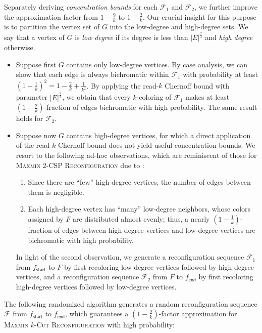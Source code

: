 \documentclass[11pt,fleqn]{article}
\newcommand{\prb}[1]{\textsc{#1}\xspace}
\newcommand{\sss}{\mathsf{start}}
\newcommand{\ttt}{\mathsf{end}}
\newcommand{\f}{f}
\newcommand{\frnd}{F}
\newcommand{\sqcol}{\scrF}
\newcommand{\MMkCutReconf}{\prb{Maxmin $k$-Cut Reconfiguration}}
\newcommand{\scrF}{\mathscr{F}}
\theoremstyle{definition}
\numberwithin{equation}{section}
\begin{document}
Separately deriving \emph{concentration bounds} for each $\sqcol_1$ and $\sqcol_2$,
we further improve the approximation factor from $1-\frac{9}{k}$ to $1-\frac{2}{k}$.
Our crucial insight for this purpose is
to partition the vertex set of $G$ into the low-degree and high-degree sets.
We say that a vertex of $G$ is
\emph{low degree} if its degree is less than $|E|^\frac{2}{3}$ and
\emph{high degree} otherwise.


\begin{itemize}
\item
Suppose first $G$ contains only low-degree vertices.
By case analysis, we can show that
each edge is always bichromatic within $\sqcol_1$
with probability at least $\left(1-\frac{1}{k}\right)^2 = 1-\frac{2}{k}+\frac{1}{k^2}$.
By applying the read-$k$ Chernoff bound \cite{gavinsky2015tail} with parameter $|E|^\frac{2}{3}$,
we obtain that
every $k$-coloring of $\sqcol_1$
makes at least $\left(1-\frac{2}{k}\right)$-fraction of edges bichromatic
with high probability.
The same result holds for $\sqcol_2$.

\item
Suppose now $G$ contains high-degree vertices,
for which a direct application of the read-$k$ Chernoff bound does not yield useful concentration bounds.
We resort to the following ad-hoc observations,
which are reminiscent of those for \prb{Maxmin $2$-CSP Reconfiguration} due to \cite{karthik2023inapproximability}:
\begin{enumerate}
    \item
    Since there are ``few'' high-degree vertices, the number of edges between them is negligible.
    \item
    Each high-degree vertex has ``many'' low-degree neighbors,
    whose colors assigned by $\frnd$ are distributed almost evenly;
    thus, a nearly $\left(1-\frac{1}{k}\right)$-fraction of edges between
    high-degree vertices and low-degree vertices
    are bichromatic with high probability.
\end{enumerate}
In light of the second observation,
we generate a reconfiguration sequence $\sqcol_1$ from $\f_\sss$ to $\frnd$
by first recoloring low-degree vertices followed by high-degree vertices, and
a reconfiguration sequence $\sqcol_2$ from $\frnd$ to $\f_\ttt$
by first recoloring high-degree vertices followed by low-degree vertices.
\end{itemize}


The following randomized algorithm 
generates a random reconfiguration sequence $\sqcol$ from $\f_\sss$ to $\f_\ttt$, which
guarantees a $\left(1-\frac{2}{k}\right)$-factor approximation for \MMkCutReconf
with high probability:
\end{document}
